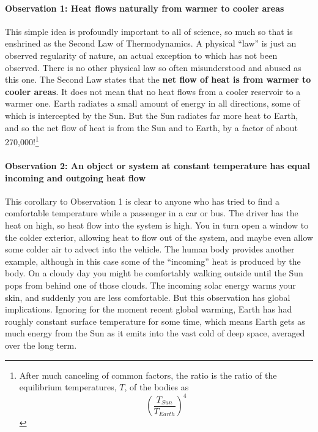 \paragraph{Observation 1: Heat flows naturally from warmer to cooler areas}\label{obs_1}
This simple idea is profoundly important to all of science, so much so that is enshrined as the Second Law of Thermodynamics. A physical ``law'' is just an observed regularity of nature, an actual exception to which has not been observed. There is no other physical law so often misunderstood and abused as this one. The Second Law states that the \textbf{net flow of heat is from warmer to cooler areas}. It does not mean that no heat flows from a cooler reservoir to a warmer one. Earth radiates a small amount of energy in all directions, some of which is intercepted by the Sun. But the Sun radiates far more heat to Earth, and so the net flow of heat is from the Sun and to Earth, by a factor of about 270,000!\footnote{After much canceling of common factors, the ratio is the ratio of the equilibrium temperatures, $T$, of the bodies as
	\[ \left(\frac{T_{Sun}}{T_{Earth}}\right)^4 \] }

\paragraph{Observation 2: An object or system at constant temperature has equal incoming and outgoing heat flow}\label{obs_2}
This corollary to Observation 1 is clear to anyone who has tried to find a comfortable temperature while a passenger in a car or bus. The driver has the heat on high, so heat flow into the system is high. You in turn open a window to the colder exterior, allowing heat to flow out of the system, and maybe even allow some colder air to advect into the vehicle. The human body provides another example, although in this case some of the ``incoming'' heat is produced by the body. On a cloudy day you might be comfortably walking outside until the Sun pops from behind one of those clouds. The incoming solar energy warms your skin, and suddenly you are less comfortable. But this observation has global implications. Ignoring for the moment recent global warming, Earth has had roughly constant surface temperature for some time, which means Earth gets as much energy from the Sun as it emits into the vast cold of deep space, averaged over the long term.
 
